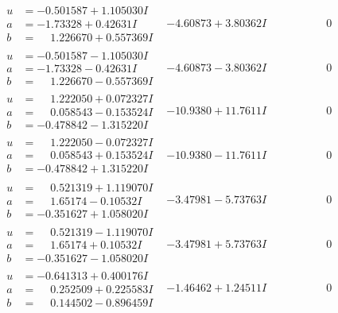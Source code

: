 \documentclass[1p]{elsarticle_modified}
\theoremstyle{definition}
\begin{document}
$$\begin{array}{c|c|c}
\begin{aligned}
u &= -0.501587 + 1.105030 I \\
a &= -1.73328 + 0.42631 I \\
b &= \phantom{-}1.226670 + 0.557369 I\end{aligned}
 & -4.60873 + 3.80362 I & \phantom{-0.000000 } 0 \\ \hline\begin{aligned}
u &= -0.501587 - 1.105030 I \\
a &= -1.73328 - 0.42631 I \\
b &= \phantom{-}1.226670 - 0.557369 I\end{aligned}
 & -4.60873 - 3.80362 I & \phantom{-0.000000 } 0 \\ \hline\begin{aligned}
u &= \phantom{-}1.222050 + 0.072327 I \\
a &= \phantom{-}0.058543 - 0.153524 I \\
b &= -0.478842 - 1.315220 I\end{aligned}
 & -10.9380 + 11.7611 I & \phantom{-0.000000 } 0 \\ \hline\begin{aligned}
u &= \phantom{-}1.222050 - 0.072327 I \\
a &= \phantom{-}0.058543 + 0.153524 I \\
b &= -0.478842 + 1.315220 I\end{aligned}
 & -10.9380 - 11.7611 I & \phantom{-0.000000 } 0 \\ \hline\begin{aligned}
u &= \phantom{-}0.521319 + 1.119070 I \\
a &= \phantom{-}1.65174 - 0.10532 I \\
b &= -0.351627 + 1.058020 I\end{aligned}
 & -3.47981 - 5.73763 I & \phantom{-0.000000 } 0 \\ \hline\begin{aligned}
u &= \phantom{-}0.521319 - 1.119070 I \\
a &= \phantom{-}1.65174 + 0.10532 I \\
b &= -0.351627 - 1.058020 I\end{aligned}
 & -3.47981 + 5.73763 I & \phantom{-0.000000 } 0 \\ \hline\begin{aligned}
u &= -0.641313 + 0.400176 I \\
a &= \phantom{-}0.252509 + 0.225583 I \\
b &= \phantom{-}0.144502 - 0.896459 I\end{aligned}
 & -1.46462 + 1.24511 I & \phantom{-0.000000 } 0 \\ \hline\begin{aligned}

\end{aligned}
\end{array}$$
\end{document}

